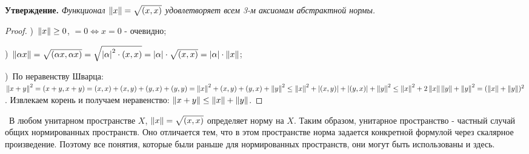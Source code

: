 \medskip
\noindent \textbf{Утверждение.} \textit{Функционал $\left\lVert x\right\rVert = \sqrt{(x, x)}$ удовлетворяет всем 3-м аксиомам абстрактной нормы. }

\medskip
\begin{proof}
   
)~$\left\lVert x\right\rVert \ge 0$, $= 0 \Longleftrightarrow x = 0$ - очевидно;

\smallskip 
{})~$\left\lVert\alpha x\right\rVert = \sqrt{(\alpha x, \alpha x)} = \sqrt{\left\lvert\alpha\right\rvert^2 \cdot (x, x)} = \left\lvert\alpha\right\rvert \cdot \sqrt{(x, x)} = \left\lvert\alpha\right\rvert \cdot \left\lVert x\right\rVert$;

\smallskip 
{})~По неравенству Шварца: $\left\lVert x + y\right\rVert^2 = (x + y, x+ y) = (x, x) + (x, y) + (y, x) + (y, y) = \left\lVert x\right\rVert^2 + (x, y) + (y, x) + \left\lVert y\right\rVert^2 \le 
\left\lVert x\right\rVert^2 + \left\lvert(x, y)\right\rvert + \left\lvert(y, x)\right\rvert + \left\lVert y\right\rVert^2 \le \left\lVert x\right\rVert^2 + 2 \left\lVert x\right\rVert \left\lVert y\right\rVert + \left\lVert y\right\rVert^2 = (\left\lVert x\right\rVert + \left\lVert y\right\rVert)^2$. Извлекаем корень и 
получаем неравенство: $\left\lVert x + y\right\rVert \le \left\lVert x\right\rVert + \left\lVert y\right\rVert$.
\end{proof}

\medskip 
\noindent \textbullet~В любом унитарном пространстве $X$, $\left\lVert x\right\rVert = \sqrt{(x, x)}$ определяет норму на $X$. Таким образом, унитарное пространство - частный случай 
общих нормированных пространств. Оно отличается тем, что в этом пространстве норма задается конкретной формулой через скалярное произведение. Поэтому все понятия, которые 
были раньше для нормированных пространств, они могут быть использованы и здесь.
